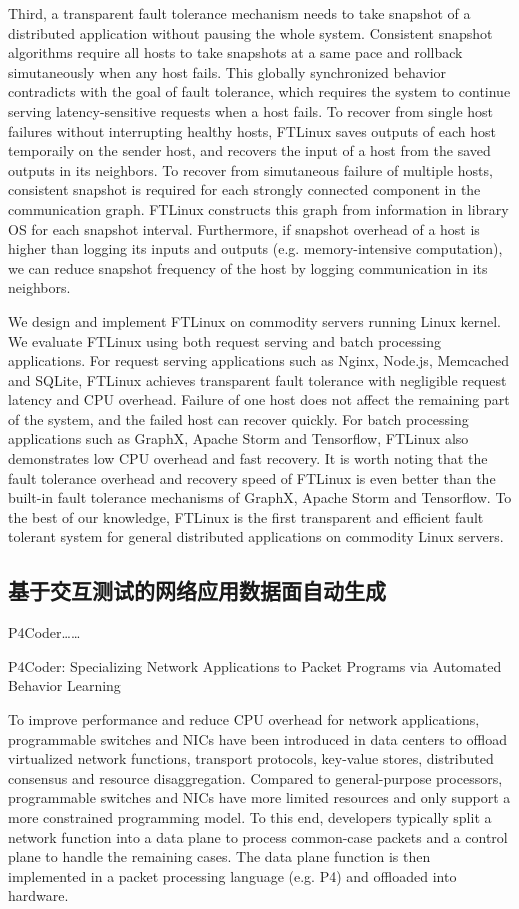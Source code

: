 Third, a transparent fault tolerance mechanism needs to take snapshot of a distributed application without pausing the whole system. Consistent snapshot algorithms require all hosts to take snapshots at a same pace and rollback simutaneously when any host fails. This globally synchronized behavior contradicts with the goal of fault tolerance, which requires the system to continue serving latency-sensitive requests when a host fails. To recover from single host failures without interrupting healthy hosts, FTLinux saves outputs of each host temporaily on the sender host, and recovers the input of a host from the saved outputs in its neighbors. To recover from simutaneous failure of multiple hosts, consistent snapshot is required for each strongly connected component in the communication graph. FTLinux constructs this graph from information in library OS for each snapshot interval. Furthermore, if snapshot overhead of a host is higher than logging its inputs and outputs (e.g. memory-intensive computation), we can reduce snapshot frequency of the host by logging communication in its neighbors.

We design and implement FTLinux on commodity servers running Linux kernel. We evaluate FTLinux using both request serving and batch processing applications. For request serving applications such as Nginx, Node.js, Memcached and SQLite, FTLinux achieves transparent fault tolerance with negligible request latency and CPU overhead. Failure of one host does not affect the remaining part of the system, and the failed host can recover quickly. For batch processing applications such as GraphX, Apache Storm and Tensorflow, FTLinux also demonstrates low CPU overhead and fast recovery. It is worth noting that the fault tolerance overhead and recovery speed of FTLinux is even better than the built-in fault tolerance mechanisms of GraphX, Apache Storm and Tensorflow. To the best of our knowledge, FTLinux is the first transparent and efficient fault tolerant system for general distributed applications on commodity Linux servers.



\subsection{基于交互测试的网络应用数据面自动生成}

P4Coder……

P4Coder: Specializing Network Applications to Packet Programs via Automated Behavior Learning

To improve performance and reduce CPU overhead for network applications, programmable switches and NICs have been introduced in data centers to offload virtualized network functions, transport protocols, key-value stores, distributed consensus and resource disaggregation. Compared to general-purpose processors, programmable switches and NICs have more limited resources and only support a more constrained programming model. To this end, developers typically split a network function into a data plane to process common-case packets and a control plane to handle the remaining cases. The data plane function is then implemented in a packet processing language (e.g. P4) and offloaded into hardware.

